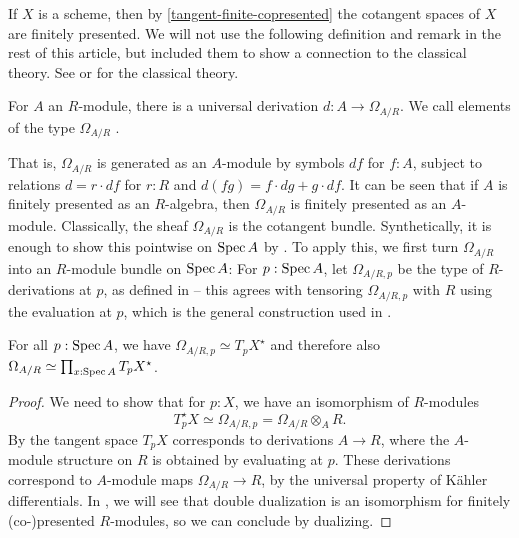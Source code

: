 If $X$ is a scheme, then by \cref{tangent-finite-copresented} the cotangent spaces of $X$
are finitely presented.
We will not use the following definition and remark in the rest of this article, but included them to show a connection to the classical theory.
See \cite[p. 172]{Hartshorne} or \cite[p. 573]{vakil} for the classical theory.

\begin{definition}
For $A$ an $R$-module, there is a universal derivation $d : A \to \Omega_{A/R}$. We call elements of the type $\Omega_{A/R}$ .

\end{definition}

That is, $\Omega_{A/R}$ is generated as an $A$-module by symbols
$df$ for $f : A$, subject to relations $d = r \cdot df$ for $r : R$ and
$d(fg) = f \cdot dg + g \cdot df$.
It can be seen that if $A$ is finitely presented as an $R$-algebra,
then $\Omega_{A/R}$ is finitely presented as an $A$-module.
Classically, the sheaf $\Omega_{A/R}$ is the cotangent bundle.
Synthetically, it is enough to show this pointwise on $\operatorname{Spec} A$ by \cite[Theorem 8.2.3]{draft}.
To apply this, we first turn $\Omega_{A/R}$ into an $R$-module bundle on $\operatorname{Spec} A$: For $p:\operatorname{Spec} A$, let $\Omega_{A/R,p}$ be the type of $R$-derivations at $p$, as defined in  -- this agrees with tensoring $\Omega_{A/R,p}$ with $R$ using the evaluation at $p$, which is the general construction used in \cite[Theorem 8.2.3]{draft}. 

\begin{remark}
For all $p:\operatorname{Spec} A$, we have $\Omega_{A/R,p}\simeq T_p X^\star$ and therefore also $\Omega_{A/R}\simeq \prod_{x:\operatorname{Spec} A}T_p X^\star$.
\end{remark}

\begin{proof}
We need to show that for $p : X$,
   we have an isomorphism of $R$-modules
   \[ T^\star_p X\simeq\Omega_{A/R,p}=\Omega_{A/R} \otimes_A R .\]
By  the tangent space $T_p X$ corresponds to derivations
$A \to R$, where the $A$-module structure on $R$ is obtained by evaluating at $p$.
These derivations correspond to $A$-module maps $\Omega_{A/R} \to R$, by the universal property
of Kähler differentials. In , we will see that double dualization is an isomorphism for finitely (co-)presented $R$-modules, so we can conclude by dualizing.
\end{proof}



